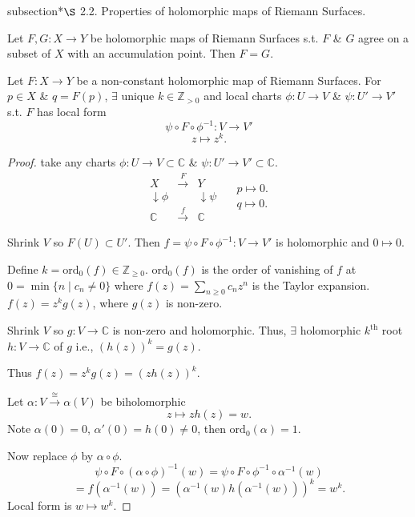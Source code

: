 \documentclass{article}
\begin{document}
subsection*{$\S$ 2.2. Properties of holomorphic maps of Riemann Surfaces.}

\begin{theorem} \label{thm:identity}
    Let $F, G: X \to Y$ be holomorphic maps of Riemann Surfaces s.t. $F$ \& $G$ agree on a subset of $X$ with an accumulation point.
    Then $F=G$.
\end{theorem}

\begin{theorem} \label{thm:localform}
    Let $F: X \to Y$ be a non-constant holomorphic map of Riemann Surfaces.
    For $p \in X$ \& $q = F(p)$, $\exists$ unique $k \in \mathbb{Z}_{>0}$ and local charts $\phi : U \to V$ \& $\psi : U' \to V'$
    s.t. $F$ has local form
    $$
    \psi \circ F \circ \phi^{-1} : V \to V'
    $$
    $$
    z \mapsto z^k.
    $$
\end{theorem}

\begin{proof} 
    take any charts $\phi: U \to V \subset \mathbb{C}$ \& $\psi: U' \to V' \subset \mathbb{C}$.
$$
\begin{array}{ccc}
    X & \xrightarrow{F} & Y \\
    \downarrow{\phi} & & \downarrow{\psi} \\
    \mathbb{C} & \xrightarrow{f} & \mathbb{C}
\end{array}
\quad
\begin{array}{l}
    p \mapsto 0. \\
    q \mapsto 0.
\end{array}
$$

Shrink $V$ so $F(U) \subset U'$. Then $f = \psi \circ F \circ \phi^{-1} : V \to V'$
is holomorphic and $0 \mapsto 0$.

Define $k = \mathrm{ord}_0(f) \in \mathbb{Z}_{\ge 0}$. $\mathrm{ord}_0(f)$ is the order of vanishing of $f$
at $0 = \min \{ n \mid c_n \neq 0 \}$ where $f(z) = \sum_{n \ge 0} c_n z^n$ is
the Taylor expansion. $f(z) = z^k g(z)$, where $g(z)$ is non-zero.

Shrink $V$ so $g: V \to \mathbb{C}$ is non-zero and holomorphic.
Thus, $\exists$ holomorphic $k^{\text{th}}$ root $h: V \to \mathbb{C}$ of $g$
i.e., $(h(z))^k = g(z)$.

Thus $f(z) = z^k g(z) = (z h(z))^k$.

Let $\alpha : V \xrightarrow{\cong} \alpha(V)$ be biholomorphic
$$
z \mapsto z h(z) = w.
$$
Note $\alpha(0) = 0$, $\alpha'(0) = h(0) \neq 0$, then $\mathrm{ord}_0(\alpha) = 1$.

Now replace $\phi$ by $\alpha \circ \phi$.
$$
\psi \circ F \circ (\alpha \circ \phi)^{-1}(w) = \psi \circ F \circ \phi^{-1} \circ \alpha^{-1}(w)
$$
$$
= f(\alpha^{-1}(w)) = (\alpha^{-1}(w) h(\alpha^{-1}(w)))^k = w^k.
$$
Local form is $w \mapsto w^k$.
\end{proof}
\end{document}
